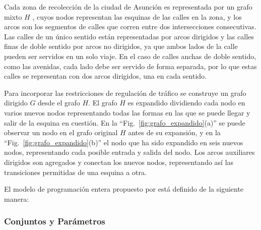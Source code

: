 \documentclass[spanish, conference]{IEEEtran}
\begin{document}
Cada zona de recolección de la ciudad de Asunción es representada por un grafo mixto $H$ \cite{Braier2017AnArgentina}, cuyos nodos representan las esquinas de las calles en la zona, y los arcos son los segmentos de calles que corren entre dos intersecciones consecutivas. Las calles de un único sentido están representadas por arcos dirigidos y las calles finas de doble sentido por arcos no dirigidos, ya que ambos lados de la calle pueden ser servidos en un solo viaje. En el caso de calles anchas de doble sentido, como las avenidas, cada lado debe ser servido de forma separada, por lo que estas calles se representan con dos arcos dirigidos, una en cada sentido.

Para incorporar las restricciones de regulación de tráfico se construye un grafo dirigido $G$ desde el grafo $H$. El grafo $H$ es expandido dividiendo cada nodo en varios nuevos nodos representando todas las formas en las que se puede llegar y salir de la esquina en cuestión. En la ``Fig.~\ref{fig:grafo_expandido}(a)'' se puede observar un nodo en el grafo original $H$ antes de su expansión, y en la ``Fig.~\ref{fig:grafo_expandido}(b)'' el nodo que ha sido expandido en seis nuevos nodos, representando cada posible entrada y salida del nodo. Los arcos auxiliares dirigidos son agregados y conectan los nuevos nodos, representando así las transiciones permitidas de una esquina a otra.

El modelo de programación entera propuesto por \cite{Braier2017AnArgentina} está definido de la siguiente manera:

\subsubsection{Conjuntos y Parámetros}
\label{sec:conjunto-parametros}
\end{document}
